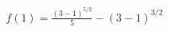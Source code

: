 \documentclass[preview]{standalone}
\begin{document}
\begin{align*}
f(1) = \frac{(3-1)^{5/2}}{5} - (3-1)^{3/2}
\end{align*}
\end{document}
